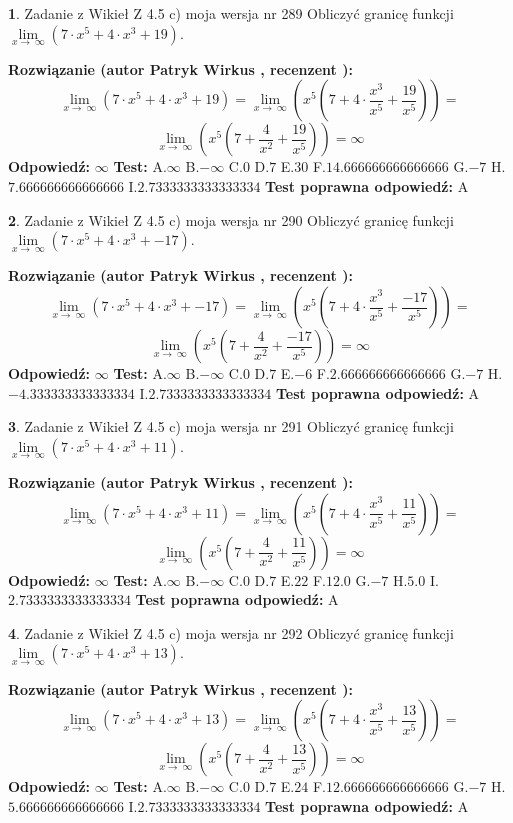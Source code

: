 \documentclass[12pt, a4paper]{article}
\theoremstyle{definition} %
\newtheorem{zad}{}
\newcommand{\zadStart}[1]{\begin{zad}#1\newline}
\newcommand{\zadStop}{\end{zad}}
\newcommand{\rozwStart}[2]{\noindent \textbf{Rozwiązanie (autor #1 , recenzent #2): }\newline}
\newcommand{\rozwStop}{\newline}
\newcommand{\odpStart}{\noindent \textbf{Odpowiedź:}\newline}
\newcommand{\odpStop}{\newline}
\newcommand{\testStart}{\noindent \textbf{Test:}\newline}
\newcommand{\testStop}{\newline}
\newcommand{\kluczStart}{\noindent \textbf{Test poprawna odpowiedź:}\newline}
\newcommand{\kluczStop}{\newline}
\begin{document}
\zadStart{Zadanie z Wikieł Z 4.5 c) moja wersja nr 289}
Obliczyć granicę funkcji  $\lim\limits_{x\to\ \infty}(7 \cdot x^{5}+4 \cdot x^{3}+19)$.
\zadStop
\rozwStart{Patryk Wirkus}{}
$$\lim\limits_{x\to\ \infty}(7 \cdot x^{5}+4 \cdot x^{3}+19) = \lim\limits_{x\to\ \infty}(x^{5}(7 +4 \cdot \frac{x^{3}}{x^{5}}+\frac{19}{x^{5}})) =$$ $$\lim\limits_{x\to\ \infty}(x^{5}(7 +\frac{4}{x^{2}}+\frac{19}{x^{5}})) =\infty$$
\rozwStop
\odpStart
$\infty$
\odpStop
\testStart
A.$\infty$ B.$-\infty$ C.$0$ D.$7$ E.$30$
F.$14.666666666666666$ G.$-7$
H.$7.666666666666666$
I.$2.7333333333333334$
\testStop
\kluczStart
A
\kluczStop



\zadStart{Zadanie z Wikieł Z 4.5 c) moja wersja nr 290}
Obliczyć granicę funkcji  $\lim\limits_{x\to\ \infty}(7 \cdot x^{5}+4 \cdot x^{3}+-17)$.
\zadStop
\rozwStart{Patryk Wirkus}{}
$$\lim\limits_{x\to\ \infty}(7 \cdot x^{5}+4 \cdot x^{3}+-17) = \lim\limits_{x\to\ \infty}(x^{5}(7 +4 \cdot \frac{x^{3}}{x^{5}}+\frac{-17}{x^{5}})) =$$ $$\lim\limits_{x\to\ \infty}(x^{5}(7 +\frac{4}{x^{2}}+\frac{-17}{x^{5}})) =\infty$$
\rozwStop
\odpStart
$\infty$
\odpStop
\testStart
A.$\infty$ B.$-\infty$ C.$0$ D.$7$ E.$-6$
F.$2.666666666666666$ G.$-7$
H.$-4.333333333333334$
I.$2.7333333333333334$
\testStop
\kluczStart
A
\kluczStop



\zadStart{Zadanie z Wikieł Z 4.5 c) moja wersja nr 291}
Obliczyć granicę funkcji  $\lim\limits_{x\to\ \infty}(7 \cdot x^{5}+4 \cdot x^{3}+11)$.
\zadStop
\rozwStart{Patryk Wirkus}{}
$$\lim\limits_{x\to\ \infty}(7 \cdot x^{5}+4 \cdot x^{3}+11) = \lim\limits_{x\to\ \infty}(x^{5}(7 +4 \cdot \frac{x^{3}}{x^{5}}+\frac{11}{x^{5}})) =$$ $$\lim\limits_{x\to\ \infty}(x^{5}(7 +\frac{4}{x^{2}}+\frac{11}{x^{5}})) =\infty$$
\rozwStop
\odpStart
$\infty$
\odpStop
\testStart
A.$\infty$ B.$-\infty$ C.$0$ D.$7$ E.$22$
F.$12.0$ G.$-7$
H.$5.0$
I.$2.7333333333333334$
\testStop
\kluczStart
A
\kluczStop



\zadStart{Zadanie z Wikieł Z 4.5 c) moja wersja nr 292}
Obliczyć granicę funkcji  $\lim\limits_{x\to\ \infty}(7 \cdot x^{5}+4 \cdot x^{3}+13)$.
\zadStop
\rozwStart{Patryk Wirkus}{}
$$\lim\limits_{x\to\ \infty}(7 \cdot x^{5}+4 \cdot x^{3}+13) = \lim\limits_{x\to\ \infty}(x^{5}(7 +4 \cdot \frac{x^{3}}{x^{5}}+\frac{13}{x^{5}})) =$$ $$\lim\limits_{x\to\ \infty}(x^{5}(7 +\frac{4}{x^{2}}+\frac{13}{x^{5}})) =\infty$$
\rozwStop
\odpStart
$\infty$
\odpStop
\testStart
A.$\infty$ B.$-\infty$ C.$0$ D.$7$ E.$24$
F.$12.666666666666666$ G.$-7$
H.$5.666666666666666$
I.$2.7333333333333334$
\testStop
\kluczStart
A
\kluczStop
\end{document}

